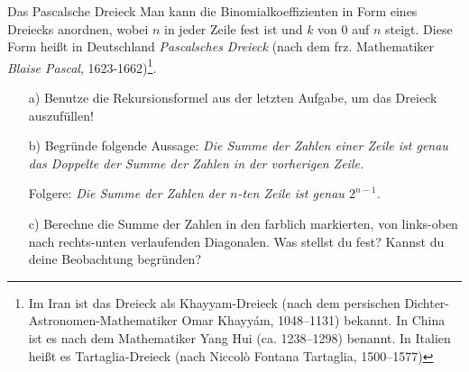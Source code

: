 \documentclass{uebungszettel}
\begin{document}
\begin{aufgabe}{Das Pascalsche Dreieck}
  Man kann die Binomialkoeffizienten in Form eines Dreiecks anordnen, wobei $n$ in jeder Zeile fest ist und $k$ von $0$ auf $n$ steigt.
  Diese Form heißt in Deutschland \emph{Pascalsches Dreieck} (nach dem frz. Mathematiker \textit{Blaise Pascal}, 1623-1662)\footnote{Im Iran ist das Dreieck als Khayyam-Dreieck (nach dem persischen Dichter-Astronomen-Mathematiker Omar Khayyám, 1048–1131) bekannt. In China ist es nach dem Mathematiker Yang Hui (ca. 1238–1298) benannt. In Italien heißt es Tartaglia-Dreieck (nach Niccolò Fontana Tartaglia, 1500–1577)}.
  

\begin{itemize}
  \item[a)] Benutze die Rekursionsformel aus der letzten Aufgabe, um das Dreieck auszufüllen!
  \item[b)] Begründe folgende Aussage: \textit{Die Summe der Zahlen einer Zeile ist genau das Doppelte der Summe der Zahlen in der vorherigen Zeile.}
  
  Folgere: \textit{Die Summe der Zahlen der $n$-ten Zeile ist genau $2^{n-1}$.}
  \item[c)] Berechne die Summe der Zahlen in den farblich markierten, von links-oben nach rechts-unten verlaufenden Diagonalen. Was stellst du fest? Kannst du deine Beobachtung begründen?
\end{itemize}
\end{aufgabe}
\end{document}
